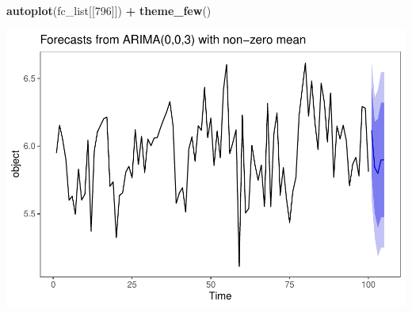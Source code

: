 \documentclass[]{article}
\newenvironment{Shaded}{\begin{snugshade}}{\end{snugshade}}
\newcommand{\DecValTok}[1]{\textcolor[rgb]{0.00,0.00,0.81}{#1}}
\newcommand{\KeywordTok}[1]{\textcolor[rgb]{0.13,0.29,0.53}{\textbf{#1}}}
\newcommand{\NormalTok}[1]{#1}
\newcommand{\OperatorTok}[1]{\textcolor[rgb]{0.81,0.36,0.00}{\textbf{#1}}}
\newcommand{\StringTok}[1]{\textcolor[rgb]{0.31,0.60,0.02}{#1}}
\begin{document}
\begin{Shaded}
\begin{Highlighting}[]
\KeywordTok{autoplot}\NormalTok{(fc_list[[}\DecValTok{796}\NormalTok{]]) }\OperatorTok{+}\StringTok{ }\KeywordTok{theme_few}\NormalTok{()}
\end{Highlighting}
\end{Shaded}

\includegraphics{Econo2_P4_files/figure-latex/forecast arima plots-4.pdf}
\end{document}
